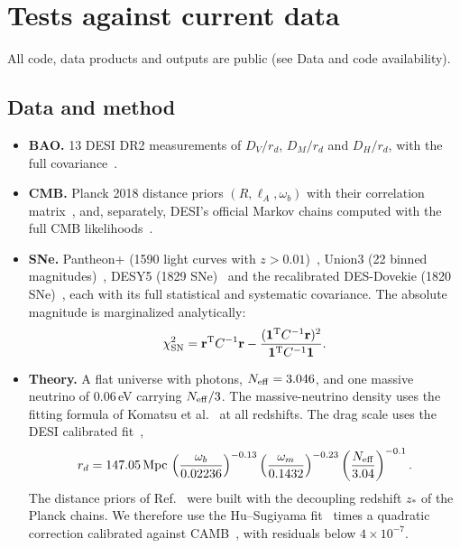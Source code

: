 \documentclass[11pt]{article}
\theoremstyle{definition}
\theoremstyle{remark}
\begin{document}
\section{Tests against current data}\label{sec:tests}

All code, data products and outputs are public (see Data and code availability).

\subsection{Data and method}

\begin{itemize}
\item \textbf{BAO.} 13 DESI DR2 measurements of $D_V/r_d$, $D_M/r_d$ and $D_H/r_d$, with the full covariance~\cite{DESI-DR2}.
\item \textbf{CMB.} Planck 2018 distance priors $(R, \ell_A, \omega_b)$ with their correlation matrix~\cite{ChenHuangWang,Planck2018}, and, separately, DESI's official Markov chains computed with the full CMB likelihoods~\cite{DESIchains}.
\item \textbf{SNe.} Pantheon+ (1590 light curves with $z > 0.01$)~\cite{PantheonPlus}, Union3 (22 binned magnitudes)~\cite{Union3}, DESY5 (1829 SNe)~\cite{DESY5} and the recalibrated DES-Dovekie (1820 SNe)~\cite{Dovekie}, each with its full statistical and systematic covariance. The absolute magnitude is marginalized analytically:
\begin{equation}
\chi^2_{\rm SN} = \mathbf r^{\rm T} C^{-1}\mathbf r - \frac{(\mathbf 1^{\rm T}C^{-1}\mathbf r)^2}{\mathbf 1^{\rm T} C^{-1}\mathbf 1}.
\end{equation}
\item \textbf{Theory.} A flat universe with photons, $N_{\rm eff} = 3.046$, and one massive neutrino of $0.06$\,eV carrying $N_{\rm eff}/3$. The massive-neutrino density uses the fitting formula of Komatsu et al.~\cite{Komatsu} at all redshifts. The drag scale uses the DESI calibrated fit~\cite{DESI-Y1},
\begin{equation}
r_d = 147.05\,\mathrm{Mpc}\,\left(\frac{\omega_b}{0.02236}\right)^{-0.13}\left(\frac{\omega_{m}}{0.1432}\right)^{-0.23}\left(\frac{N_{\rm eff}}{3.04}\right)^{-0.1}.
\end{equation}
The distance priors of Ref.~\cite{ChenHuangWang} were built with the decoupling redshift $z_*$ of the Planck chains. We therefore use the Hu--Sugiyama fit~\cite{HuSugiyama} times a quadratic correction calibrated against CAMB~\cite{CAMB}, with residuals below $4\times10^{-7}$.

\end{itemize}
\end{document}

